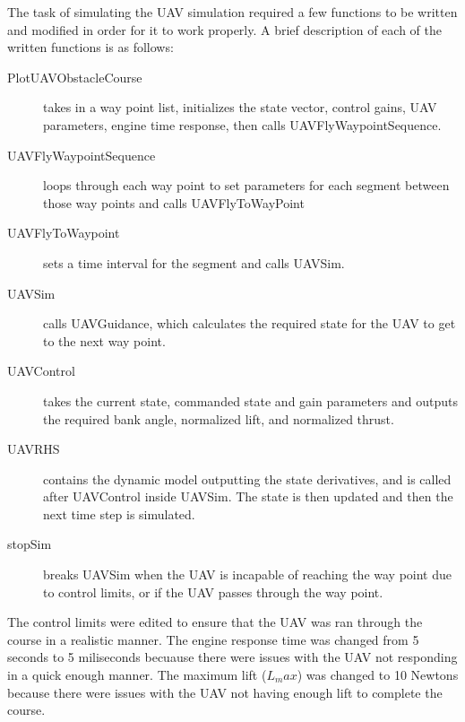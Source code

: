 \documentclass[12pt]{article}
\begin{document}
The task of simulating the UAV simulation required a few functions to be written and modified in order for it to work properly. A brief description of each of the written functions is as follows: 
\begin{description}
	\item[PlotUAVObstacleCourse] takes in a way point list, initializes the state vector, control gains, UAV parameters, engine time response, then calls UAVFlyWaypointSequence.
	\item[UAVFlyWaypointSequence] loops through each way point to set parameters for each segment between those way points and calls UAVFlyToWayPoint
	\item[UAVFlyToWaypoint] sets a time interval for the segment and calls 
	UAVSim. 
	\item[UAVSim] calls UAVGuidance, which calculates the required state for the UAV to get to the next way point. 
	\item[UAVControl] takes the current state, commanded state and gain parameters and outputs the required bank angle, normalized lift, and normalized thrust.
	\item[UAVRHS] contains the dynamic model outputting the state derivatives, and is called after UAVControl inside UAVSim. The state is then updated and then the next time step is simulated. 
	\item[stopSim] breaks UAVSim when the UAV is incapable of reaching the way point due to control limits, or if the UAV passes through the way point. 
\end{description}

The control limits were edited to ensure that the UAV was ran through the course in a realistic manner. The engine response time was changed from 5 seconds to 5 miliseconds becuause there were issues with the UAV not responding in a quick enough manner. The maximum lift ($L_max$) was changed to 10 Newtons because there were issues with the UAV not having enough lift to complete the course. 
\end{document}
